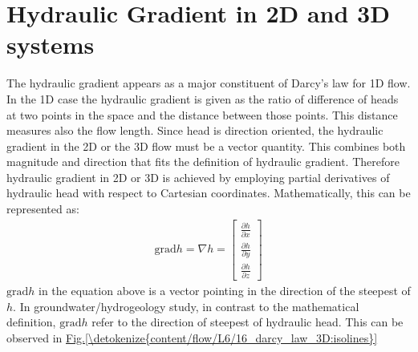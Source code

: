\documentclass[letterpaper,10pt,english]{jupyterBook}
\begin{document}
\section{Hydraulic Gradient in 2D and 3D systems}
\label{\detokenize{content/flow/L6/16_darcy_law_3D:hydraulic-gradient-in-2d-and-3d-systems}}
\sphinxAtStartPar
The hydraulic gradient appears as a major constituent of Darcy’s law for 1D flow. In the 1D case the hydraulic gradient is given as the ratio of difference of heads at two points in the space and the distance between those points. This distance measures also the flow length. Since head is direction oriented, the hydraulic gradient in the 2D or the 3D flow must be a vector quantity. This combines both magnitude and direction that fits the definition of hydraulic gradient. Therefore hydraulic gradient in 2D or 3D is achieved by employing partial derivatives of hydraulic head with respect to Cartesian coordinates. Mathematically, this can be represented as:
\begin{equation*}
\begin{split}
\text{grad}h=\nabla h = \begin{bmatrix}
\frac{\partial h}{\partial x}
\\ 
\frac{\partial h}{\partial y}
\\ 
\frac{\partial h}{\partial z}
\end{bmatrix}   
\end{split}
\end{equation*}
\sphinxAtStartPar
\(\text{grad}h\) in the equation above is a vector pointing in the direction of the steepest  of \(h\). In groundwater/hydrogeology study, in contrast to the mathematical definition, \(\text{grad}h\) refer to the direction of steepest  of hydraulic head. This can be observed in \hyperref[\detokenize{content/flow/L6/16_darcy_law_3D:isolines}]{Fig.\@ \ref{\detokenize{content/flow/L6/16_darcy_law_3D:isolines}}}
\end{document}
